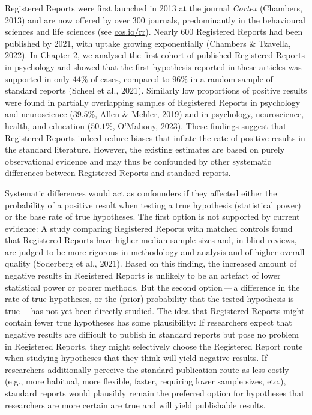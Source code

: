 \documentclass[
  ,man,mask,floatsintext]{apa6}
\begin{document}
Registered Reports were first launched in 2013 at the journal \emph{Cortex} (Chambers, 2013) and are now offered by over 300 journals, predominantly in the behavioural sciences and life sciences (see \url{cos.io/rr}).
Nearly 600 Registered Reports had been published by 2021, with uptake growing exponentially (Chambers \& Tzavella, 2022).
In Chapter 2, we analysed the first cohort of published Registered Reports in psychology and showed that the first hypothesis reported in these articles was supported in only \(44\%\) of cases, compared to \(96\%\) in a random sample of standard reports (Scheel et al., 2021).
Similarly low proportions of positive results were found in partially overlapping samples of Registered Reports in psychology and neuroscience (\(39.5\%\), Allen \& Mehler, 2019) and in psychology, neuroscience, health, and education (\(50.1\%\), O'Mahony, 2023).
These findings suggest that Registered Reports indeed reduce biases that inflate the rate of positive results in the standard literature.
However, the existing estimates are based on purely observational evidence and may thus be confounded by other systematic differences between Registered Reports and standard reports.

Systematic differences would act as confounders if they affected either the probability of a positive result when testing a true hypothesis (statistical power) or the base rate of true hypotheses.
The first option is not supported by current evidence:
A study comparing Registered Reports with matched controls found that Registered Reports have higher median sample sizes and, in blind reviews, are judged to be more rigorous in methodology and analysis and of higher overall quality (Soderberg et al., 2021).
Based on this finding, the increased amount of negative results in Registered Reports is unlikely to be an artefact of lower statistical power or poorer methods.
But the second option\(\,\)---\(\,\)a difference in the rate of true hypotheses, or the (prior) probability that the tested hypothesis is true\(\,\)---\(\,\)has not yet been directly studied.
The idea that Registered Reports might contain fewer true hypotheses has some plausibility:
If researchers expect that negative results are difficult to publish in standard reports but pose no problem in Registered Reports, they might selectively choose the Registered Report route when studying hypotheses that they think
will yield negative results.
If researchers additionally perceive the standard publication route as less costly (e.g., more habitual, more flexible, faster, requiring lower sample sizes, etc.), standard reports would plausibly remain the preferred option for hypotheses that researchers are more certain are true and will yield publishable results.
\end{document}
